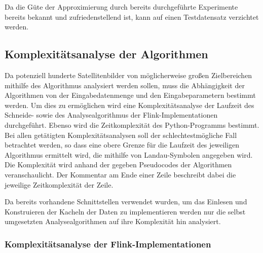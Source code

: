 Da die Güte der Approximierung durch bereits durchgeführte Experimente bereits bekannt und zufriedenstellend ist, kann auf einen Testdatensatz verzichtet werden.

\subsection{Komplexitätsanalyse der Algorithmen}
\label{sec:ComplexityAnalysis}
Da potenziell hunderte Satellitenbilder von möglicherweise großen Zielbereichen mithilfe des Algorithmus analysiert werden sollen, muss die Abhängigkeit der Algorithmen von der Eingabedatenmenge und den Eingabeparametern bestimmt werden. Um dies zu ermöglichen wird eine Komplexitätsanalyse der Laufzeit des Schneide- sowie des Analysealgorithmus der Flink-Implementationen durchgeführt. Ebenso wird die Zeitkomplexität des Python-Programms bestimmt. Bei allen getätigten Komplexitätsanalysen soll der schlechtestmögliche Fall betrachtet werden, so dass eine obere Grenze für die Laufzeit des jeweiligen Algorithmus ermittelt wird, die mithilfe von Landau-Symbolen angegeben wird. Die Komplexität wird anhand der gegeben Pseudocodes der Algorithmen veranschaulicht. Der Kommentar am Ende einer Zeile beschreibt dabei die jeweilige Zeitkomplexität der Zeile. 

Da bereits vorhandene Schnittstellen verwendet wurden, um das Einlesen und Konstruieren der Kacheln der Daten zu implementieren werden nur die selbst umgesetzten Analysealgorithmen auf ihre Komplexität hin analysiert.

\subsubsection{Komplexitätsanalyse der Flink-Implementationen}


